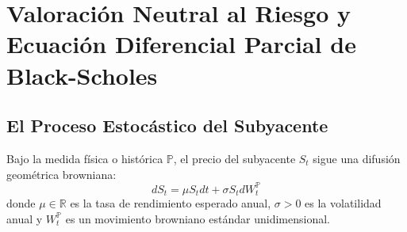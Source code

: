 \documentclass[11pt,a4paper]{article}
\begin{document}
\newpage
\section{Valoración Neutral al Riesgo y Ecuación Diferencial Parcial de Black-Scholes}

\subsection{El Proceso Estocástico del Subyacente}
Bajo la medida física o histórica $\mathbb{P}$, el precio del subyacente $S_t$ sigue una difusión geométrica browniana:
\begin{equation}
    dS_t = \mu S_t dt + \sigma S_t dW_t^{\mathbb{P}}
\end{equation}
donde $\mu \in \mathbb{R}$ es la tasa de rendimiento esperado anual, $\sigma > 0$ es la volatilidad anual y $W_t^{\mathbb{P}}$ es un movimiento browniano estándar unidimensional.
\end{document}
